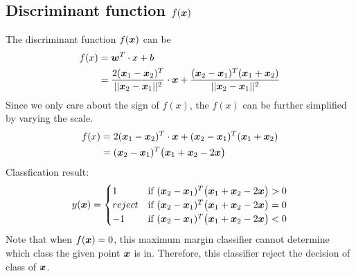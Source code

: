 \documentclass[11pt,a4paper]{article}
\newcommand{\htab}{\hspace*{0.63cm}}
\begin{document}
\subsection{Discriminant function $f(\boldsymbol{x})$}
\newcommand{\newf}{(\xt - \xo)^{T} \big( \xo + \xt - 2 \x \big)}
\htab The discriminant function $f(\boldsymbol{x})$ can be
\begin{align}
    f(x) &= \boldsymbol{w}^{T} \cdot x + b \\
         &= \frac{2(\boldsymbol{x}_{1} - \boldsymbol{x}_{2})^{T}}{||\boldsymbol{x}_{2} - \boldsymbol{x}_{1}||^{2}} \cdot \boldsymbol{x} + \frac{(\boldsymbol{x}_{2} - \boldsymbol{x}_{1})^{T}(\boldsymbol{x}_{1} + \boldsymbol{x}_{2})}{||\boldsymbol{x}_{2} - \boldsymbol{x}_{1}||^{2}}
    \end{align}
    \htab Since we only care about the sign of $f(x)$, the $f(x)$ can be further simplified by varying the scale.
    \begin{align}
        f(x) &= 2 (\boldsymbol{x}_{1} - \boldsymbol{x}_{2})^{T} \cdot \boldsymbol{x} + (\boldsymbol{x}_{2} - \boldsymbol{x}_{1})^{T}(\boldsymbol{x}_{1} + \boldsymbol{x}_{2}) \\
             &= (\boldsymbol{x}_{2} - \boldsymbol{x}_{1})^{T} \big( \boldsymbol{x}_{1} + \boldsymbol{x}_{2} - 2 \boldsymbol{x} \big)
        \end{align}
\htab Classfication result:
\begin{equation}
y(\x)=\begin{cases}
    1 & \text{if}\  \newf > 0 \\
    reject & \text{if}\ \newf = 0 \\
    -1 & \text{if}\ \newf < 0
\end{cases}
\end{equation}
\htab Note that when $f(\boldsymbol{x}) = 0$, this maximum margin classifier cannot determine which class the given 
point $\boldsymbol{x}$ is in. Therefore, this classifier reject the decision of class of $\boldsymbol{x}$.
\end{document}
